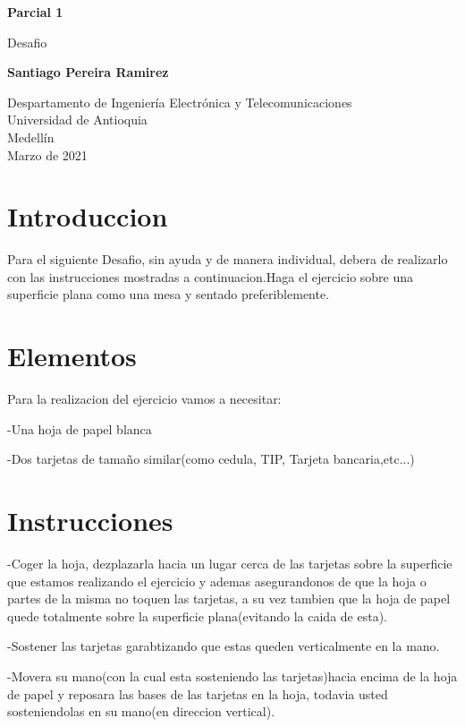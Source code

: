 \documentclass{article}
\begin{document}
\begin{titlepage}
    \begin{center}
        \vspace*{1cm}
            
        \Huge
        \textbf{Parcial 1 }
            
        \vspace{0.5cm}
        \LARGE
        Desafio
            
        \vspace{1.5cm}
            
        \textbf{Santiago Pereira Ramirez}
            
        \vfill
            
        \vspace{0.8cm}
            
        \Large
        Despartamento de Ingeniería Electrónica y Telecomunicaciones\\
        Universidad de Antioquia\\
        Medellín\\
        Marzo de 2021
            
    \end{center}
\end{titlepage}

\tableofcontents
\newpage
\section{Introduccion }\label{intro}
Para el siguiente Desafio, sin ayuda y de manera individual, debera de realizarlo con las instrucciones mostradas a continuacion.Haga el ejercicio sobre una superficie plana como una mesa y sentado preferiblemente.

\section{Elementos} \label{contenido}
Para la realizacion del ejercicio vamos a necesitar:

    -Una hoja de papel blanca
    
    -Dos tarjetas de tamaño similar(como cedula, TIP, Tarjeta bancaria,etc...)

\section{Instrucciones} \label{contenido}
    
    -Coger la hoja, dezplazarla hacia un lugar cerca de las tarjetas sobre la superficie que estamos realizando el ejercicio y ademas asegurandonos de que la hoja o partes de la misma no toquen las tarjetas, a su vez tambien que la hoja de papel quede totalmente sobre la superficie plana(evitando la caida de esta).
    
    -Sostener las tarjetas garabtizando que estas queden verticalmente en la mano.
    
    -Movera su mano(con la cual esta sosteniendo las tarjetas)hacia encima de la hoja de papel y reposara las bases de las tarjetas en la hoja, todavia
    usted sosteniendolas en su mano(en direccion vertical).
    


\end{document}
